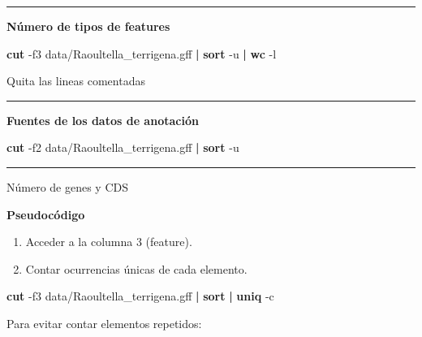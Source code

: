 \documentclass[
]{book}
\newenvironment{Shaded}{\begin{snugshade}}{\end{snugshade}}
\newcommand{\AttributeTok}[1]{\textcolor[rgb]{0.13,0.29,0.53}{#1}}
\newcommand{\FunctionTok}[1]{\textcolor[rgb]{0.13,0.29,0.53}{\textbf{#1}}}
\newcommand{\KeywordTok}[1]{\textcolor[rgb]{0.13,0.29,0.53}{\textbf{#1}}}
\newcommand{\NormalTok}[1]{#1}
\begin{document}
\begin{center}\rule{0.5\linewidth}{0.5pt}\end{center}

\textbf{Número de tipos de features}

\begin{Shaded}
\begin{Highlighting}[]
\FunctionTok{cut} \AttributeTok{{-}f3}\NormalTok{ data/Raoultella\_terrigena.gff }\KeywordTok{|} \FunctionTok{sort} \AttributeTok{{-}u} \KeywordTok{|} \FunctionTok{wc} \AttributeTok{{-}l}
\end{Highlighting}
\end{Shaded}

Quita las lineas comentadas

\begin{center}\rule{0.5\linewidth}{0.5pt}\end{center}

\textbf{Fuentes de los datos de anotación}

\begin{Shaded}
\begin{Highlighting}[]
\FunctionTok{cut} \AttributeTok{{-}f2}\NormalTok{ data/Raoultella\_terrigena.gff }\KeywordTok{|} \FunctionTok{sort} \AttributeTok{{-}u}
\end{Highlighting}
\end{Shaded}

\begin{center}\rule{0.5\linewidth}{0.5pt}\end{center}

Número de genes y CDS

\textbf{Pseudocódigo}

\begin{enumerate}
\def\labelenumi{\arabic{enumi}.}
\item
  Acceder a la columna 3 (feature).
\item
  Contar ocurrencias únicas de cada elemento.
\end{enumerate}

\begin{Shaded}
\begin{Highlighting}[]
\FunctionTok{cut} \AttributeTok{{-}f3}\NormalTok{ data/Raoultella\_terrigena.gff }\KeywordTok{|} \FunctionTok{sort} \KeywordTok{|} \FunctionTok{uniq} \AttributeTok{{-}c}
\end{Highlighting}
\end{Shaded}

Para evitar contar elementos repetidos:
\end{document}
